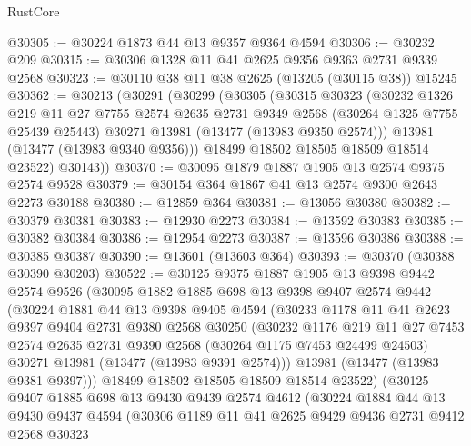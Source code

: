 \begin{lexlean}{RustCore}
\begin{coremodule}
@30305 := @30224 @1873 @44 @13 @9357 @9364 @4594
@30306 := @30232 @209
@30315 := @30306 @1328 @11 @41 @2625 @9356 @9363 @2731 @9339 @2568
@30323 := @30110 @38 @11 @38 @2625 (@13205 (@30115 @38)) @15245
@30362 := @30213
    (@30291
      (@30299
        (@30305
          (@30315
            @30323
            (@30232
              @1326
              @219
              @11
              @27
              @7755
              @2574
              @2635
              @2731
              @9349
              @2568
              (@30264 @1325 @7755 @25439 @25443)
              @30271
              @13981
              (@13477 (@13983 @9350 @2574)))
            @13981
            (@13477 (@13983 @9340 @9356)))
          @18499
          @18502
          @18505
          @18509
          @18514
          @23522)
        @30143))
@30370 := @30095 @1879 @1887 @1905 @13 @2574 @9375 @2574 @9528
@30379 := @30154 @364 @1867 @41 @13 @2574 @9300 @2643 @2273 @30188
@30380 := @12859 @364
@30381 := @13056 @30380
@30382 := @30379 @30381
@30383 := @12930 @2273
@30384 := @13592 @30383
@30385 := @30382 @30384
@30386 := @12954 @2273
@30387 := @13596 @30386
@30388 := @30385 @30387
@30390 := @13601 (@13603 @364)
@30393 := @30370 (@30388 @30390 @30203)
@30522 := @30125
    @9375
    @1887
    @1905
    @13
    @9398
    @9442
    @2574
    @9526
    (@30095
      @1882
      @1885
      @698
      @13
      @9398
      @9407
      @2574
      @9442
      (@30224
        @1881
        @44
        @13
        @9398
        @9405
        @4594
        (@30233
          @1178
          @11
          @41
          @2623
          @9397
          @9404
          @2731
          @9380
          @2568
          @30250
          (@30232
            @1176
            @219
            @11
            @27
            @7453
            @2574
            @2635
            @2731
            @9390
            @2568
            (@30264 @1175 @7453 @24499 @24503)
            @30271
            @13981
            (@13477 (@13983 @9391 @2574)))
          @13981
          (@13477 (@13983 @9381 @9397)))
        @18499
        @18502
        @18505
        @18509
        @18514
        @23522)
      (@30125
        @9407
        @1885
        @698
        @13
        @9430
        @9439
        @2574
        @4612
        (@30224
          @1884
          @44
          @13
          @9430
          @9437
          @4594
          (@30306
            @1189
            @11
            @41
            @2625
            @9429
            @9436
            @2731
            @9412
            @2568
            @30323

\end{coremodule}
\end{lexlean}
